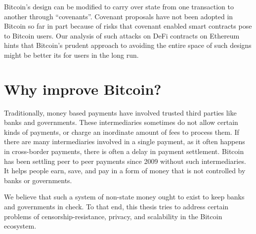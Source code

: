 Bitcoin's design can be modified to carry over state from one transaction to another through ``covenants''. Covenant proposals have not been adopted in Bitcoin so far in part because of risks that covenant enabled smart contracts pose to Bitcoin users. Our analysis of such attacks on DeFi contracts on Ethereum hints that Bitcoin's prudent approach to avoiding the entire space of such designs might be better its for users in the long run.

\section{Why improve Bitcoin?}
Traditionally, money based payments have involved trusted third parties like banks and governments. These intermediaries sometimes do not allow certain kinds of payments, or charge an inordinate amount of fees to process them. If there are many intermediaries involved in a single payment, as it often happens in cross-border payments, there is often a delay in payment settlement. Bitcoin has been settling peer to peer payments since 2009 without such intermediaries. It helps people earn, save, and pay in a form of money that is not controlled by banks or governments. 

We believe that such a system of non-state money ought to exist to keep banks and governments in check. To that end, this thesis tries to address certain problems of censorship-resistance, privacy, and scalability in the Bitcoin ecosystem.